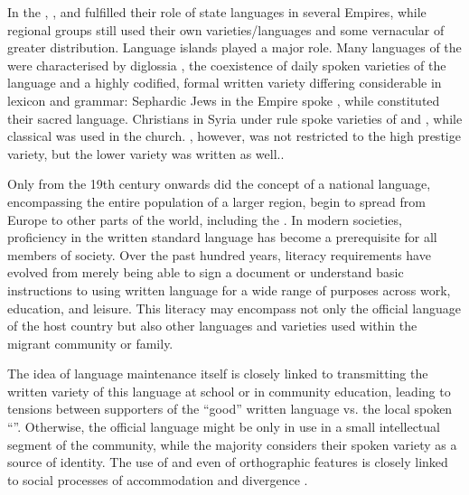 \documentclass[output=paper,colorlinks,citecolor=brown]{langscibook}
\begin{document}
In the , ,  and   fulfilled their role of state languages in several Empires, while regional groups still used their own varieties/languages and some vernacular of greater distribution. Language islands played a major role. Many languages of the  were characterised by diglossia \citep{ferguson1959,ferguson1996}, the coexistence of daily spoken varieties of the language and a highly codified, formal written variety differing considerable in lexicon and grammar: Sephardic Jews in the  Empire spoke , while  constituted their sacred language.  Christians in Syria under  rule spoke varieties of  and , while classical  was used in the church. , however, was not restricted to the high prestige variety, but the lower variety was written as well..

Only from the 19th century onwards did the concept of a national language, encompassing the entire population of a larger region, begin to spread from Europe to other parts of the world, including the . In modern societies, proficiency in the written standard language has become a prerequisite for all members of society. Over the past hundred years, literacy requirements have evolved from merely being able to sign a document or understand basic instructions to using written language for a wide range of purposes across work, education, and leisure. This literacy may encompass not only the official language of the host country but also other languages and varieties used within the migrant community or family.

The idea of language maintenance \citep{fishman1995} itself is closely linked to transmitting the written variety of this language at school or in community education, leading to tensions between supporters of the ``good'' written language vs. the local spoken ``''. Otherwise, the official  language might be only in use in a small intellectual segment of the community, while the majority considers their spoken variety as a source of identity. The use of  and even of orthographic features is closely linked to social processes of accommodation and divergence \citep{sebba2007,jaffe_androutsopoulos_sebba_johnson2012}.
\end{document}
